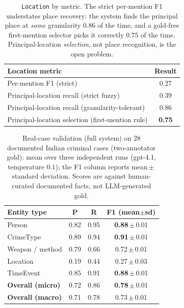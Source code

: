 \documentclass[conference]{IEEEtran}
\newcommand{\node}[1]{\texttt{#1}}
\begin{document}
\begin{table}[t]
  \centering
  \caption{\node{Location} by metric. The strict per-mention F1 understates place
  recovery: the system finds the principal place at \emph{some} granularity $0.86$
  of the time, and a gold-free first-mention selector picks it correctly $0.75$ of
  the time. Principal-location \emph{selection}, not place recognition, is the
  open problem.}
  \label{tab:locmetrics}
  \footnotesize
  \setlength{\tabcolsep}{5pt}
  \begin{tabular}{@{}P{5.8cm}c@{}}
    \toprule
    \textbf{Location metric} & \textbf{Result} \\
    \midrule
    Per-mention F1 (strict)                          & 0.27 \\
    Principal-location recall (strict fuzzy)         & 0.39 \\
    Principal-location recall (granularity-tolerant) & 0.86 \\
    Principal-location selection (first-mention rule) & \textbf{0.75} \\
    \bottomrule
  \end{tabular}
\end{table}

\begin{table}[t]
  \centering
  \caption{Real-case validation (full system) on 28 documented Indian criminal
  cases (two-annotator gold): mean over three independent runs (gpt-4.1,
  temperature $0.1$); the F1 column reports mean\,$\pm$\,standard deviation. Scores
  are against human-curated documented facts, not LLM-generated gold.}
  \label{tab:realcase}
  \small
  \begin{tabular}{@{}lccc@{}}
    \toprule
    \textbf{Entity type} & \textbf{P} & \textbf{R} & \textbf{F1 (mean$\pm$sd)} \\
    \midrule
    Person          & 0.82 & 0.95 & \textbf{0.88}\,$\pm$\,0.01 \\
    CrimeType       & 0.89 & 0.94 & \textbf{0.91}\,$\pm$\,0.01 \\
    Weapon / method & 0.79 & 0.66 & 0.72\,$\pm$\,0.01 \\
    Location        & 0.19 & 0.44 & 0.27\,$\pm$\,0.03 \\
    TimeEvent       & 0.85 & 0.91 & \textbf{0.88}\,$\pm$\,0.01 \\
    \midrule
    \textbf{Overall (micro)} & 0.72 & 0.86 & \textbf{0.78}\,$\pm$\,0.01 \\
    \textbf{Overall (macro)} & 0.71 & 0.78 & 0.73\,$\pm$\,0.01 \\
    \bottomrule
  \end{tabular}
\end{table}
\end{document}
